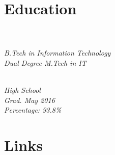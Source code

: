 \documentclass[]{deedy-resume-openfont}
\begin{document}
%
%

%
%






%
%

\begin{minipage}[t]{0.33\textwidth} 


\section{Education} 

\\
\textit{\\B.Tech in Information Technology\\ Dual Degree M.Tech in IT}\\ 
\sectionsep

\\
\textit{High School\\Grad. May 2016\\ Percentage: 93.8\%\\}
\sectionsep


\section{Links} 
\faGithub \href{https://github.com/Ellusionists}{} \\
\faLinkedin  \href{https://www.linkedin.com/in/aditya-goel-11a578134/}{} \\
\faTwitter \href{https://twitter.com/itsAdityaGoel}{} \\
\sectionsep


\end{minipage}
\end{document}
